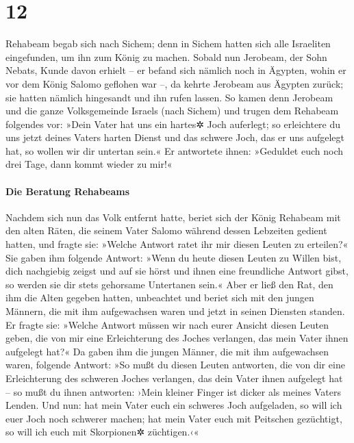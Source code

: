 \hypertarget{section-11}{%
\section{12}\label{section-11}}

Rehabeam begab sich nach Sichem; denn in Sichem hatten
sich alle Israeliten eingefunden, um ihn zum König zu machen.
Sobald nun Jerobeam, der Sohn Nebats, Kunde davon erhielt
-- er befand sich nämlich noch in Ägypten, wohin er vor dem König Salomo
geflohen war --, da kehrte Jerobeam aus Ägypten zurück;
sie hatten nämlich hingesandt und ihn rufen lassen. So
kamen denn Jerobeam und die ganze Volksgemeinde Israels (nach Sichem)
und trugen dem Rehabeam folgendes vor: »Dein Vater hat uns
ein hartes✲ Joch auferlegt; so erleichtere du uns jetzt deines Vaters
harten Dienst und das schwere Joch, das er uns aufgelegt hat, so wollen
wir dir untertan sein.« Er antwortete ihnen: »Geduldet
euch noch drei Tage, dann kommt wieder zu mir!«

\hypertarget{die-beratung-rehabeams}{%
\paragraph{Die Beratung Rehabeams}\label{die-beratung-rehabeams}}

Nachdem sich nun das Volk entfernt hatte, beriet sich der
König Rehabeam mit den alten Räten, die seinem Vater Salomo während
dessen Lebzeiten gedient hatten, und fragte sie: »Welche Antwort ratet
ihr mir diesen Leuten zu erteilen?« Sie gaben ihm folgende
Antwort: »Wenn du heute diesen Leuten zu Willen bist, dich nachgiebig
zeigst und auf sie hörst und ihnen eine freundliche Antwort gibst, so
werden sie dir stets gehorsame Untertanen sein.« Aber er
ließ den Rat, den ihm die Alten gegeben hatten, unbeachtet und beriet
sich mit den jungen Männern, die mit ihm aufgewachsen waren und jetzt in
seinen Diensten standen. Er fragte sie: »Welche Antwort
müssen wir nach eurer Ansicht diesen Leuten geben, die von mir eine
Erleichterung des Joches verlangen, das mein Vater ihnen aufgelegt hat?«
Da gaben ihm die jungen Männer, die mit ihm aufgewachsen
waren, folgende Antwort: »So mußt du diesen Leuten antworten, die von
dir eine Erleichterung des schweren Joches verlangen, das dein Vater
ihnen aufgelegt hat -- so mußt du ihnen antworten: ›Mein kleiner Finger
ist dicker als meines Vaters Lenden. Und nun: hat mein
Vater euch ein schweres Joch aufgeladen, so will ich euer Joch noch
schwerer machen; hat mein Vater euch mit Peitschen gezüchtigt, so will
ich euch mit Skorpionen✲ züchtigen.‹«

